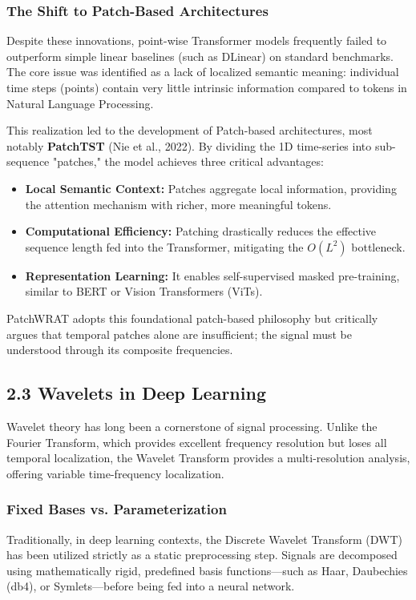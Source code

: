 \documentclass[11pt, letterpaper]{article}
\begin{document}
\subsubsection{The Shift to Patch-Based Architectures}
Despite these innovations, point-wise Transformer models frequently failed to outperform simple linear baselines (such as DLinear) on standard benchmarks. The core issue was identified as a lack of localized semantic meaning: individual time steps (points) contain very little intrinsic information compared to tokens in Natural Language Processing.

This realization led to the development of Patch-based architectures, most notably \textbf{PatchTST} (Nie et al., 2022). By dividing the 1D time-series into sub-sequence "patches," the model achieves three critical advantages:
\begin{itemize}
    \item \textbf{Local Semantic Context:} Patches aggregate local information, providing the attention mechanism with richer, more meaningful tokens.
    \item \textbf{Computational Efficiency:} Patching drastically reduces the effective sequence length fed into the Transformer, mitigating the $O(L^2)$ bottleneck.
    \item \textbf{Representation Learning:} It enables self-supervised masked pre-training, similar to BERT or Vision Transformers (ViTs).
\end{itemize}
PatchWRAT adopts this foundational patch-based philosophy but critically argues that temporal patches alone are insufficient; the signal must be understood through its composite frequencies.

\subsection{2.3 Wavelets in Deep Learning}

Wavelet theory has long been a cornerstone of signal processing. Unlike the Fourier Transform, which provides excellent frequency resolution but loses all temporal localization, the Wavelet Transform provides a multi-resolution analysis, offering variable time-frequency localization.

\subsubsection{Fixed Bases vs. Parameterization}
Traditionally, in deep learning contexts, the Discrete Wavelet Transform (DWT) has been utilized strictly as a static preprocessing step. Signals are decomposed using mathematically rigid, predefined basis functions—such as Haar, Daubechies (db4), or Symlets—before being fed into a neural network. 
\end{document}

